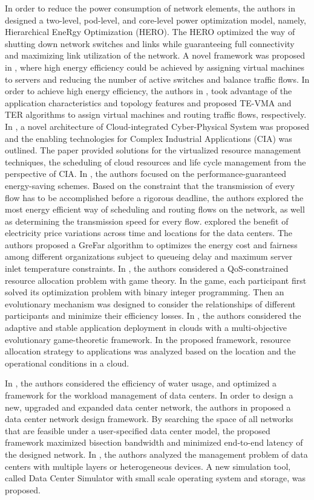 \documentclass[twocolumn,10pt]{IEEEtran}
\begin{document}
In order to reduce the power consumption of network elements, the authors in \cite{YZhang01} designed a two-level, pod-level, and core-level power optimization model, namely, Hierarchical EneRgy Optimization (HERO). The HERO optimized the way of shutting down network switches and links while guaranteeing full connectivity and maximizing link utilization of the network. A novel framework was proposed in \cite{LWang01}, where high energy efficiency could be achieved by assigning virtual machines to servers and reducing the number of active switches and balance traffic flows. In order to achieve high energy efficiency, the authors in \cite{LWang02}, took advantage of the application characteristics and topology features and proposed TE-VMA and TER algorithms to assign virtual machines and routing traffic flows, respectively. In \cite{ZShu01}, a novel architecture of Cloud-integrated Cyber-Physical System was proposed and the enabling technologies for Complex Industrial Applications (CIA) was outlined. The paper provided solutions for the virtualized resource management techniques, the scheduling of cloud resources and life cycle management from the perspective of CIA. In \cite{LWang03}, the authors focused on the performance-guaranteed energy-saving schemes. Based on the constraint that the transmission of every flow has to be accomplished before a rigorous deadline, the authors explored the most energy efficient way of scheduling and routing flows on the network, as well as determining the transmission speed for every flow. \cite{Polverini01} explored the benefit of electricity price variations across time and locations for the data centers. The authors proposed a GreFar algorithm to optimizes the energy cost and fairness among different organizations subject to queueing delay and maximum server inlet temperature constraints. In \cite{Wei01}, the authors considered a QoS-constrained resource allocation problem with game theory. In the game, each participant first solved its optimization problem with binary integer programming. Then an evolutionary mechanism was designed to consider the relationships of different participants and minimize their efficiency losses. In \cite{Ren01}, the authors considered the adaptive and stable application deployment in clouds with a multi-objective evolutionary game-theoretic framework. In the proposed framework, resource allocation strategy to applications was analyzed based on the location and the operational conditions in a cloud.

In \cite{LLiu01}, the authors considered the efficiency of water usage, and optimized a framework for the workload management of data centers. In order to design a new, upgraded and expanded data center network, the authors in \cite{ARCurtis01} proposed a data center network design framework. By searching the space of all networks that are feasible under a user-specified data center model, the proposed framework maximized bisection bandwidth and minimized end-to-end latency of the designed network. In \cite{CJChen01}, the authors analyzed the management problem of data centers with multiple layers or heterogeneous devices. A new simulation tool, called Data Center Simulator with small scale operating system and storage, was proposed.
\end{document}
